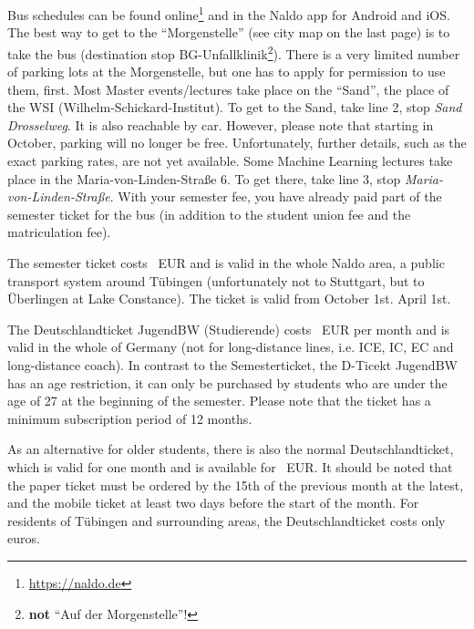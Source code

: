 \ifml
    Bus schedules can be found online\footnote{\url{https://naldo.de}} and in the Naldo app for Android and iOS.\\
    The best way to get to the "`Morgenstelle"' (see city map on the last page) is to take the bus (destination stop BG-Unfallklinik\footnote{\textbf{not} "`Auf der Morgenstelle"'!}). There is a very limited number of parking lots at the Morgenstelle, but one has to apply for permission to use them, first.
    Most Master events/lectures take place on the "`Sand"', the place of the WSI (Wilhelm-Schickard-Institut). To get to the Sand, take line 2, stop \emph{Sand Drosselweg}.  It is also reachable by car. However, please note that starting in October, parking will no longer be free. Unfortunately, further details, such as the exact parking rates, are not yet available.
    Some Machine Learning lectures take place in the Maria-von-Linden-Straße 6. To get there, take line 3, stop \emph{Maria-von-Linden-Straße}.
    With your semester fee, you have already paid part of the semester ticket for the bus (in addition to the student union fee and the matriculation fee).
    
    The semester ticket costs \semesterticketpreis~EUR and is valid in the whole Naldo area, a public transport system around
    Tübingen (unfortunately not to Stuttgart, but to Überlingen at Lake Constance).
    The ticket is valid from
    \ifwintersemester
    October 1st.
    \fi
    \ifsommersemester
    April 1st.
    \fi
    
    The Deutschlandticket JugendBW (Studierende) costs \jugendticketbwpreis~EUR per month and is valid in the whole of Germany (not for long-distance lines, i.e. ICE, IC, EC and long-distance coach).
    In contrast to the Semesterticket, the D-Ticekt JugendBW has an age restriction, it can only be purchased by students who are under the age of 27 at the beginning of the semester. Please note that the ticket has a minimum subscription period of 12 months.

    As an alternative for older students, there is also the normal Deutschlandticket, which is valid for one month and is available for \detickettuepreis~EUR. 
    It should be noted that the paper ticket must be ordered by the 15th of the previous month at the latest, and the mobile ticket at least two days before the start of the month.
    For residents of Tübingen and surrounding areas, the Deutschlandticket costs only \detickettuebewohnipreis euros.


